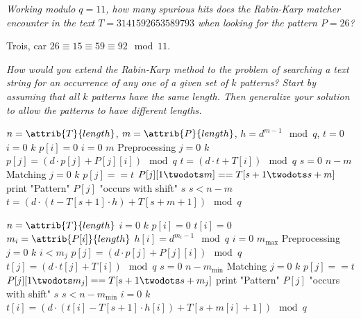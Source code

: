 \begin{description}
 \textit{Working modulo $q = 11$, how many spurious hits does the Rabin-Karp matcher encounter in the text $T = 3141592653589793$ when looking for the pattern $P = 26$?}
\begin{ex}
Trois, car $26 \equiv 15 \equiv 59 \equiv 92\mod 11$.
\end{ex}
 \textit{How would you extend the Rabin-Karp method to the problem of searching a text
string for an occurrence of any one of a given set of $k$ patterns? Start by assuming
that all $k$ patterns have the same length. Then generalize your solution to allow the
patterns to have different lengths.}

\begin{ex}
\begin{codebox}
    \li $n = \attrib{T}{length}$,  $m = \attrib{P}{length}$, $h = d^{m-1} \mod q$, $t = 0$
    \li \For $i=0$ \To $k$ \Do
        \li $p[i] = 0$ \End
    \li \For $i=0$ \To $m$ \Comment Preprocessing \Do
      \li \For $j=0$ \To $k$ \Do
        \li $p[j] = (d \cdot p[j] + P[j][i]) \mod q$ \End
      \li $t = (d \cdot t + T[i]) \mod q$ \End
    \li \For $s = 0$ \To $n - m$ \Comment Matching \Do
      \li \For $j=0$ \To $k$ \Do
        \li \If $p[j] == t$ \Then
           \li \If $P[j][1 \twodots m] == T[s + 1 \twodots s + m]$ \Then
             \li print "Pattern" $P[j]$ "occurs with shift" $s$ 
           \End
        \End
      \End
      \li \If $s < n - m$ \Then
        \li $t = (d \cdot (t - T[s+1] \cdot h) + T[s + m + 1]) \mod q$
      \End
   \End
\end{codebox}
\begin{codebox}
    \li $n = \attrib{T}{length}$
    \li \For $i=0$ \To $k$ \Do
        \li $p[i] = 0$ 
        \li $t[i] = 0$ 
        \li $m_i = \attrib{P[i]}{length}$
        \li $h[i] = d^{m_i - 1} \mod q$ 
    \End
    \li \For $i=0$ \To $m_{\max}$ \Comment Preprocessing \Do
      \li \For $j=0$ \To $k$ \Do
        \li \If $i < m_j$ \Then 
          \li $p[j] = (d \cdot p[j] + P[j][i]) \mod q$ 
          \li $t[j] = (d \cdot t[j] + T[i]) \mod q$ 
        \End
      \End
    \End
    \li \For $s = 0$ \To $n - m_{\min}$ \Comment Matching \Do
      \li \For $j=0$ \To $k$ \Do
        \li \If $p[j] == t$ \Then
           \li \If $P[j][1 \twodots m_j] == T[s + 1 \twodots s + m_j]$ \Then
             \li print "Pattern" $P[j]$ "occurs with shift" $s$ 
           \End
        \End
      \End
      \li \If $s < n - m_{\min}$ \Then
        \li \For $i=0$ \To $k$ \Do
          \li $t[i] = (d \cdot (t[i] - T[s+1] \cdot h[i]) + T[s + m[i] + 1]) \mod q$
        \End
      \End
   \End
\end{codebox}
\end{ex}

 \textit{}
 \textit{}
\end{description}


